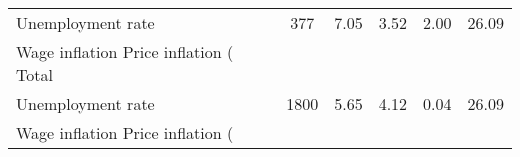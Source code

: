 \begin{table}[htbp]
\begin{tabular}{l*{1}{ccccc}}
Unemployment rate   &         377&        7.05&        3.52&        2.00&       26.09\\
Wage inflation %
Price inflation (%
\hline
Total               &            &            &            &            &            \\
Unemployment rate   &        1800&        5.65&        4.12&        0.04&       26.09\\
Wage inflation %
Price inflation (%
\hline\hline
\end{tabular}
\end{table}
